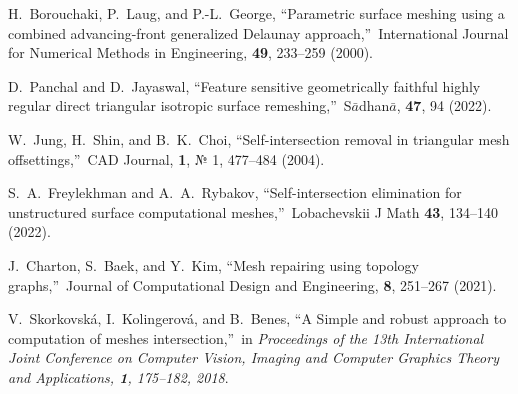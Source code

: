 \documentclass[
11pt,%
tightenlines,%
twoside,%
onecolumn,%
nofloats,%
nobibnotes,%
nofootinbib,%
superscriptaddress,%
noshowpacs,%
centertags]%
{revtex4}
\begin{document}
\begin{thebibliography}{99}
H.~Borouchaki, P.~Laug, and P.-L.~George, \textquotedblleft Parametric surface meshing using a combined advancing-front generalized Delaunay approach,\textquotedblright \ International Journal for Numerical Methods in Engineering, {\bf 49}, 233--259 (2000).

D.~Panchal and D.~Jayaswal, \textquotedblleft Feature sensitive geometrically faithful highly regular direct triangular isotropic surface remeshing,\textquotedblright \ S$\bar{a}$dhan$\bar{a}$, {\bf 47}, 94 (2022).


W.~Jung, H.~Shin, and B.~K.~Choi, \textquotedblleft Self-intersection removal in triangular mesh offsettings,\textquotedblright \ CAD Journal, {\bf 1}, № 1, 477--484 (2004).

S.~A.~Freylekhman and A.~A.~Rybakov, \textquotedblleft Self-intersection elimination for unstructured surface computational meshes,\textquotedblright \ Lobachevskii J Math {\bf 43}, 134--140 (2022).

J.~Charton, S.~Baek, and Y.~Kim, \textquotedblleft Mesh repairing using topology graphs,\textquotedblright \ Journal of Computational Design and Engineering, {\bf 8}, 251--267 (2021).

V.~Skorkovsk\'a, I.~Kolingerov\'a, and B.~Benes, \textquotedblleft A Simple and robust approach to computation of meshes intersection,\textquotedblright \ in \textit{Proceedings of the 13th International Joint Conference on Computer Vision, Imaging and Computer Graphics Theory and Applications, {\bf 1}, 175--182, 2018}.

\end{thebibliography}
\end{document}
